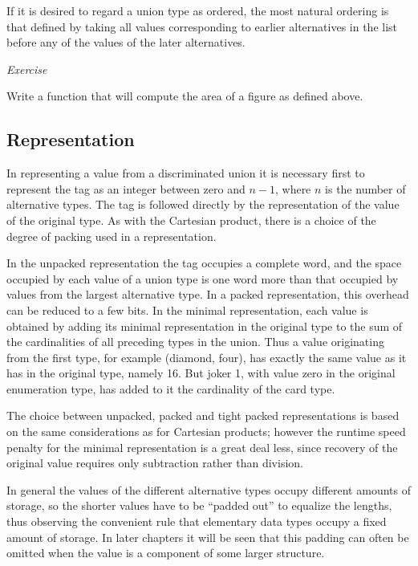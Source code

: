 If it is desired to regard a union type as ordered, the most natural ordering is that defined by taking all values corresponding to earlier alternatives in the list before any of the values of the later alternatives.

\noindent
\textit{Exercise}
\nopagebreak

\noindent
Write a function that will compute the area of a figure as defined above.

\subsection{Representation}

In representing a value from a discriminated union it is necessary first to represent the tag as an integer between zero and $n - 1$, where $n$ is the number of alternative types. The tag is followed directly by the representation of the value of the original type. As with the Cartesian product, there is a choice of the degree of packing used in a representation.

In the unpacked representation the tag occupies a complete word, and the space occupied by each value of a union type is one word more than that occupied by values from the largest alternative type. In a packed representation, this overhead can be reduced to a few bits. In the minimal representation, each value is obtained by adding its minimal representation in the original type to the sum of the cardinalities of all preceding types in the union. Thus a value originating from the first type, for example (diamond, four), has exactly the same value as it has in the original type, namely 16. But joker 1, with value zero in the original enumeration type, has added to it the cardinality of the card type.

The choice between unpacked, packed and tight packed representations is based on the same considerations as for Cartesian products; however the runtime speed penalty for the minimal representation is a great deal less, since recovery of the original value requires only subtraction rather than division.

In general the values of the different alternative types occupy different amounts of storage, so the shorter values have to be ``padded out'' to equalize the lengths, thus observing the convenient rule that elementary data types occupy a fixed amount of storage. In later chapters it will be seen that this padding can often be omitted when the value is a component of some larger structure.

